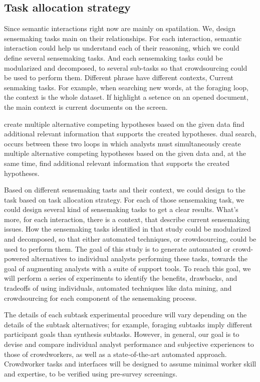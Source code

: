\documentclass[journal]{vgtc}                %
\begin{document}
\subsection{Task allocation strategy}


Since semantic interactions right now are mainly on spatilation. We, design sensemaking tasks main on their relationships.
For each interaction, semantic interaction could help us understand each of their reasoning, which we could define several sensemaking tasks.
And each sensemaking tasks could be modularized and decomposed, to several sub-tasks so that crowdsourcing could be used to perform them.
Different phrase have different contexts,
Current senmaking tasks. For example, when searching new words, at the foraging loop, the context is the whole dataset. If highlight a setence on an opened document, the main context is current documents on the screen.

create multiple alternative competing hypotheses based on the given data
find additional relevant information that supports the created hypotheses.
dual search, occurs between these two loops in which analysts must simultaneously create multiple alternative competing hypotheses based on the given data and, at the same time, find additional relevant information that supports the created hypotheses.

Based on different sensemaking tasts and their context, we could design to the task based on task allocation strategy.
For each of those sensemaking task, we could design several kind of sensemaking tasks to get a clear results.
What's more, for each interaction, there is a context, that describe current sensemaking issues.
How the sensemaking tasks identified in that study could be modularized and decomposed, so that either automated techniques, or crowdsourcing, could be used to perform them. The goal of this study is to generate automated or crowd-powered alternatives to individual analysts performing these tasks, towards the goal of augmenting analysts with a suite of support tools. To reach this goal, we will perform a series of experiments to identify the benefits, drawbacks, and tradeoffs of using individuals, automated techniques like data mining, and crowdsourcing for each component of the sensemaking process.

The details of each subtask experimental procedure will vary depending on the details of the subtask alternatives; for example, foraging subtasks imply different participant goals than synthesis subtasks. However, in general, our goal is to devise and compare individual analyst performance and subjective experiences to those of crowdworkers, as well as a state-of-the-art automated approach. Crowdworker tasks and interfaces will be designed to assume minimal worker skill and expertise, to be verified using pre-survey screenings.
\end{document}
